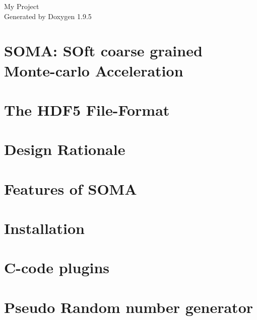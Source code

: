 \documentclass[twoside]{book}
\newcommand{\+}{\discretionary{\mbox{\scriptsize$\hookleftarrow$}}{}{}}
\newcommand{\clearemptydoublepage}{%
    \newpage{\pagestyle{empty}\cleardoublepage}%
  }
\begin{document}
  \raggedbottom
    \hypersetup{pageanchor=false,
                bookmarksnumbered=true,
                pdfencoding=unicode
               }
  \begin{titlepage}
  \vspace*{7cm}
  \begin{center}%
  {\Large My Project}\\
  \vspace*{1cm}
  {\large Generated by Doxygen 1.9.5}\\
  \end{center}
  \end{titlepage}
  \clearemptydoublepage
  \tableofcontents
  \clearemptydoublepage
  \hypersetup{pageanchor=true}
\chapter{SOMA\+: SOft coarse grained Monte-\/carlo Acceleration}
\label{index}\hypertarget{index}{}
\chapter{The HDF5 File-\/\+Format}
\label{hdf5}

\chapter{Design Rationale}
\label{design}

\chapter{Features of SOMA}
\label{features}

\chapter{Installation}
\label{install}

\chapter{C-\/code plugins}
\label{plugin}

\chapter{Pseudo Random number generator}
\label{prng_gen}

\end{document}
